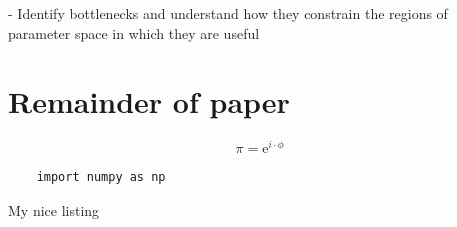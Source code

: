    - Identify bottlenecks and understand how they constrain the regions of parameter space in which they are useful

   
    \section{Remainder of paper}



\begin{equation}
	\pi = \mathrm{e}^{i\cdot\phi}
	\label{eq:equation1}
\end{equation}

\begin{listing}
	\begin{verbatim} 
	import numpy as np
	\end{verbatim}
  \caption{My nice listing}
  \label{lst:nice_listing}
\end{listing}
